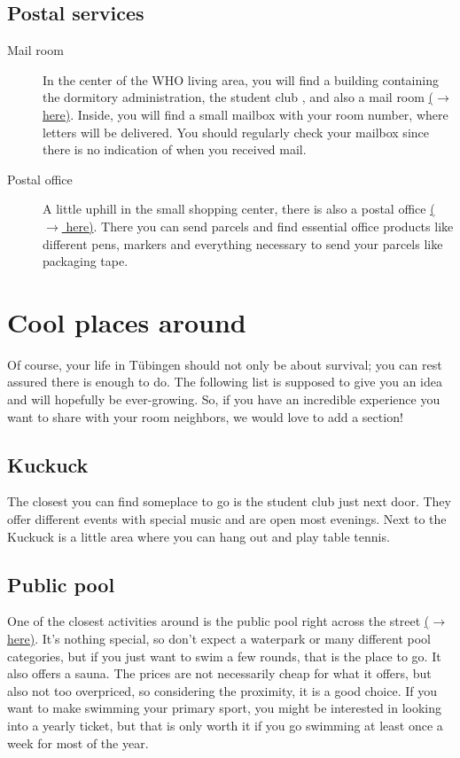 \subsection{Postal services}
\begin{description}
    \item[Mail room]
    In the center of the WHO living area, you will find a building containing the dormitory administration, the student club , and also a mail room \href{https://maps.app.goo.gl/W9UtqfhE1LJJ5oGH8}{($\xrightarrow{}$ here)}. Inside, you will find a small mailbox with your room number, where letters will be delivered. You should regularly check your mailbox since there is no indication of when you received mail.
    \item[Postal office]
    A little uphill in the small  shopping center, there is also a postal office \href{https://maps.app.goo.gl/nMnEheHexNQ5NZY37}{($\xrightarrow{}$ here)}. There you can send parcels and find essential office products like different pens, markers and everything necessary to send your parcels like packaging tape.
\end{description}

\section{Cool places around}
Of course, your life in Tübingen should not only be about survival; you can rest assured there is enough to do. The following list is supposed to give you an idea and will hopefully be ever-growing. So, if you have an incredible experience you want to share with your room neighbors, we would love to add a section!

\subsection{Kuckuck}
The closest you can find someplace to go is the student club  just next door. They offer different events with special music and are open most evenings. Next to the Kuckuck is a little area where you can hang out and play table tennis.

\subsection{Public pool}
One of the closest activities around is the public pool right across the street \href{https://maps.app.goo.gl/NZaCajzPTgFjabqH6}{($\xrightarrow{}$ here)}. It's nothing special, so don't expect a waterpark or many different pool categories, but if you just want to swim a few rounds, that is the place to go. It also offers a sauna. The prices are not necessarily cheap for what it offers, but also not too overpriced, so considering the proximity, it is a good choice. If you want to make swimming your primary sport, you might be interested in looking into a yearly ticket, but that is only worth it if you go swimming at least once a week for most of the year.

